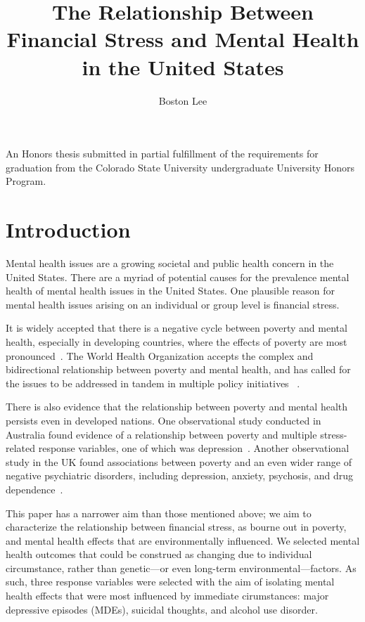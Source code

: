 \documentclass{article}
\title{The Relationship Between Financial Stress and Mental Health in the United States}
\author{Boston Lee}
\begin{document}
\maketitle

\vfill
\begin{center}
\begin{minipage}{30em}
\begin{center}
An Honors thesis submitted in partial fulfillment of the requirements for
graduation from the Colorado State University undergraduate University Honors
Program.
\end{center}
\end{minipage}
\end{center}
\vfill

\pagebreak

\tableofcontents

\pagebreak

\section{Introduction}

Mental health issues are a growing societal and public health concern
in the United States.
There are a myriad of potential causes for the prevalence mental health
of mental health issues in the United States.
One plausible reason for mental health issues arising
on an individual or group level
is financial stress.

It is widely accepted that there is a
negative cycle between poverty and mental health,
especially in developing countries,
where the effects of poverty are most pronounced~\cite{lund_2011}.
The World Health Organization accepts
the complex and bidirectional
relationship between poverty and mental health,
and has called for the issues to be addressed
in tandem in multiple policy initiatives~\cite{who_2003} \cite{who_2010}.

There is also evidence that the relationship
between poverty and mental health persists
even in developed nations.
One observational study conducted in Australia
found evidence of a relationship between
poverty and multiple stress-related response variables,
one of which was depression~\cite{saunders_1998}.
Another observational study in the UK found associations
between poverty and an even wider range of negative
psychiatric disorders, including depression,
anxiety, psychosis, and drug dependence~\cite{murali_oyebode_2004}.

This paper has a narrower aim than those mentioned above;
we aim to characterize the relationship between
financial stress, as bourne out in poverty,
and mental health effects
that are environmentally influenced.
We selected mental health outcomes that
could be construed as changing due to
individual circumstance,
rather than genetic---or even long-term environmental---factors.
As such, three response variables were selected
with the aim of isolating mental health effects that were
most influenced by immediate cirumstances:
major depressive episodes (MDEs),
suicidal thoughts,
and alcohol use disorder.
\end{document}

